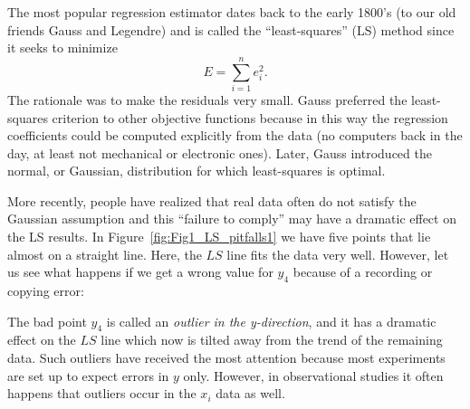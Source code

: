 	The most popular regression estimator dates back to the early 1800's (to our old friends Gauss and Legendre) 
and is called the ``least-squares'' (LS) method since it seeks to minimize
\begin{equation}
E = \sum^n_{i=1} e^2_i.
\end{equation}	 
The rationale was to make the residuals very small.  Gauss preferred the least-squares 
criterion to other objective functions because in this way the regression coefficients could be 
computed explicitly from the data (no computers back in the day, at least not mechanical or electronic ones).
Later, Gauss introduced the  normal, or Gaussian, distribution for which least-squares is optimal.
	
More recently, people have realized that real data often do not satisfy the Gaussian 
assumption and this ``failure to comply'' may have a dramatic effect on the LS results.  In Figure~\ref{fig:Fig1_LS_pitfalls1} we have five points that lie almost 
on a straight line.  Here, the $LS$ line fits the data very well.  However, let us see what happens if 
we get a wrong value for $y_4$ because of a recording or copying error:
	 

The bad point $y_4$  is called an \emph{outlier in the y-direction}, and it has a dramatic effect on the $LS$ line 
which now is tilted away from the trend of the remaining data.  Such outliers have received the most 
attention because most experiments are set up to expect errors in $y$ only.  However, in 
observational studies it often happens that outliers occur in the $x_i$ data as well.


